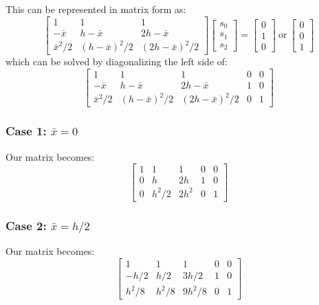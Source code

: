 \documentclass{article}
\begin{document}
This can be represented in matrix form as:
\begin{equation}
\begin{bmatrix}
1 & 1 & 1 \\
-\bar x & h-\bar x & 2h-\bar x \\
\bar x^2/2 & (h-\bar x)^2/2 & (2h-\bar x)^2/2
\end{bmatrix}
\begin{bmatrix}
s_0 \\ s_1 \\ s_2
\end{bmatrix}
=
\begin{bmatrix}
0 \\ 1 \\ 0
\end{bmatrix}
\ \mathrm{or}\ 
\begin{bmatrix}
0 \\ 0 \\ 1
\end{bmatrix}
\end{equation}
which can be solved by diagonalizing the left side of:
\begin{equation}
\begin{bmatrix}
1 & 1 & 1 & 0 & 0\\
-\bar x & h-\bar x & 2h-\bar x & 1 & 0\\
\bar x^2/2 & (h-\bar x)^2/2 & (2h-\bar x)^2/2 & 0 & 1
\end{bmatrix}
\end{equation}

\subsubsection*{Case 1: $\bar x=0$}
Our matrix becomes:
\begin{equation}
\begin{bmatrix}
1 & 1 & 1 & 0 & 0\\
0 & h & 2h & 1 & 0\\
0 & h^2/2 & 2h^2 & 0 & 1
\end{bmatrix}
\end{equation}

\subsubsection*{Case 2: $\bar x=h/2$}
Our matrix becomes:
\begin{equation}
\begin{bmatrix}
1 & 1 & 1 & 0 & 0\\
-h/2 & h/2 & 3h/2 & 1 & 0\\
h^2/8 & h^2/8 & 9h^2/8 & 0 & 1
\end{bmatrix}
\end{equation}
\end{document}
